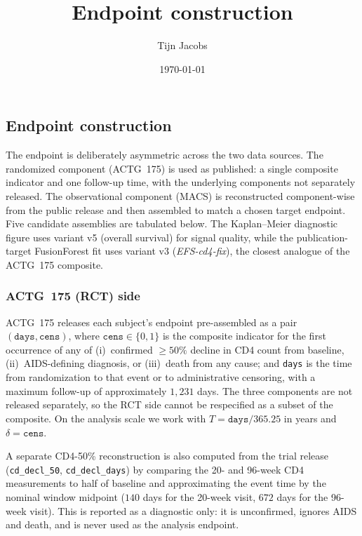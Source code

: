\documentclass[11pt]{article}
\title{Endpoint construction}
\author{Tijn Jacobs}
\date{\today}
\theoremstyle{plain}
\theoremstyle{definition}
\theoremstyle{remark}
\newcommand{\1}{\mathds{1}}
\begin{document}
\maketitle

\subsection{Endpoint construction}

The endpoint is deliberately asymmetric across the two data sources. The
randomized component (ACTG~175) is used as published: a single composite
indicator and one follow-up time, with the underlying components not
separately released. The observational component (MACS) is reconstructed
component-wise from the public release and then assembled to match a
chosen target endpoint. Five candidate assemblies are tabulated below.
The Kaplan--Meier diagnostic figure uses variant v5 (overall survival)
for signal quality, while the publication-target FusionForest fit uses
variant v3 (\emph{EFS-cd4-fix}), the closest analogue of the ACTG~175
composite.

\subsubsection*{ACTG~175 (RCT) side}

ACTG~175 releases each subject's endpoint pre-assembled as a pair
$(\texttt{days}, \texttt{cens})$, where $\texttt{cens} \in \{0, 1\}$ is
the composite indicator for the first occurrence of any of (i)~confirmed
$\geq 50\%$ decline in CD4 count from baseline, (ii)~AIDS-defining
diagnosis, or (iii)~death from any cause; and \texttt{days} is the time
from randomization to that event or to administrative censoring, with a
maximum follow-up of approximately $1{,}231$ days. The three components
are not released separately, so the RCT side cannot be respecified as a
subset of the composite. On the analysis scale we work with
$T = \texttt{days}/365.25$ in years and $\delta = \texttt{cens}$.

A separate CD4-50\% reconstruction is also computed from the trial
release (\texttt{cd\_decl\_50}, \texttt{cd\_decl\_days}) by comparing the
20- and 96-week CD4 measurements to half of baseline and approximating
the event time by the nominal window midpoint ($140$ days for the
20-week visit, $672$ days for the 96-week visit). This is reported as a
diagnostic only: it is unconfirmed, ignores AIDS and death, and is never
used as the analysis endpoint.
\end{document}
